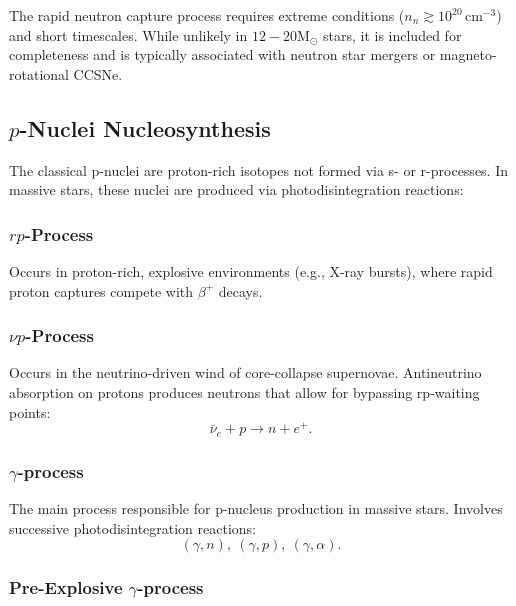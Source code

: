 The rapid neutron capture process requires extreme conditions (\( n_n \gtrsim 10^{20}\,\mathrm{cm}^{-3} \)) and short timescales. While unlikely in $12-20 \mathrm{M}_\odot$ stars, it is included for completeness and is typically associated with neutron star mergers or magneto-rotational CCSNe.

\subsection{\texorpdfstring{$p$-Nuclei Nucleosynthesis}{p-Nuclei Nucleosynthesis}}

The classical p-nuclei are proton-rich isotopes not formed via s- or r-processes. In massive stars, these nuclei are produced via photodisintegration reactions:

\subsubsection{\texorpdfstring{$rp$-Process}{rp-Process}}

Occurs in proton-rich, explosive environments (e.g., X-ray bursts), where rapid proton captures compete with $\beta^+$ decays.

\subsubsection{\texorpdfstring{$\nu p$-Process}{nu-p Process}}

Occurs in the neutrino-driven wind of core-collapse supernovae. Antineutrino absorption on protons produces neutrons that allow for bypassing rp-waiting points:
\begin{equation}
\bar{\nu}_e + p \rightarrow n + e^+.
\end{equation}

\subsubsection{\texorpdfstring{$\gamma$-process}{gamma-process}}

The main process responsible for p-nucleus production in massive stars. Involves successive photodisintegration reactions:
\begin{equation}
(\gamma, n),\ (\gamma, p),\ (\gamma, \alpha).
\end{equation}

\subsubsection{Pre-Explosive \texorpdfstring{$\gamma$-process}{gamma-process}}

